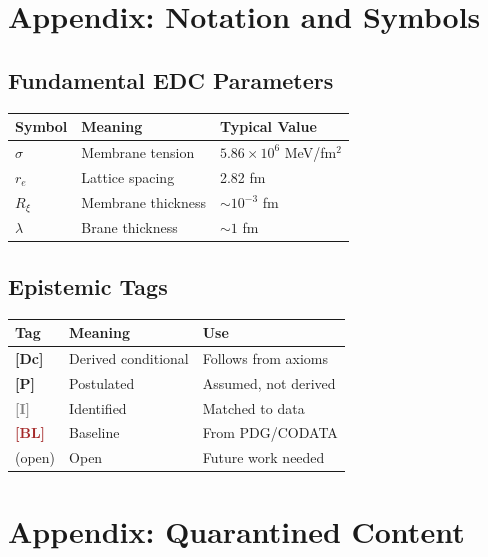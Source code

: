 \documentclass[11pt,a4paper]{book}
\theoremstyle{definition}
\theoremstyle{remark}
\newcommand{\tagBL}{\textcolor{brown}{\textbf{[BL]}}}
\newcommand{\tagDc}{\textcolor{calibratedColor}{\textbf{[Dc]}}}
\newcommand{\tagI}{\textcolor{gray}{\textbf{[I]}}}
\newcommand{\tagP}{\textcolor{postulatedColor}{\textbf{[P]}}}
\begin{document}
\chapter*{Appendix: Notation and Symbols}

\section*{Fundamental EDC Parameters}

\begin{center}
\begin{tabular}{lll}
\toprule
\textbf{Symbol} & \textbf{Meaning} & \textbf{Typical Value} \\
\midrule
$\sigma$ & Membrane tension & $5.86 \times 10^{6}$ MeV/fm$^2$ \\
$r_e$ & Lattice spacing & 2.82 fm \\
$R_\xi$ & Membrane thickness & $\sim 10^{-3}$ fm \\
$\lambda$ & Brane thickness & $\sim 1$ fm \\
\bottomrule
\end{tabular}
\end{center}

\section*{Epistemic Tags}

\begin{center}
\begin{tabular}{lll}
\toprule
\textbf{Tag} & \textbf{Meaning} & \textbf{Use} \\
\midrule
\tagDc{} & Derived conditional & Follows from axioms \\
\tagP{} & Postulated & Assumed, not derived \\
\tagI{} & Identified & Matched to data \\
\tagBL{} & Baseline & From PDG/CODATA \\
(open) & Open & Future work needed \\
\bottomrule
\end{tabular}
\end{center}

\chapter*{Appendix: Quarantined Content}
\end{document}
